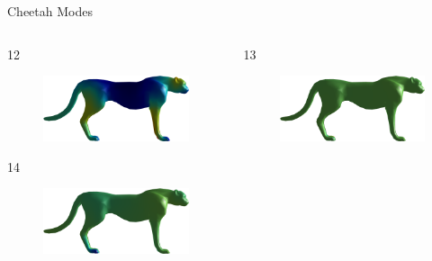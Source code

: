 \documentclass{beamer}
\begin{document}
\begin{frame}{Cheetah Modes}

\begin{columns}
\begin{column}[T]{5cm}
12
\begin{figure}[t]
    \includegraphics[width=\textwidth]{Harmonics/CheetahModes/12.png}
\end{figure}
14
\begin{figure}[t]
    \includegraphics[width=\textwidth]{Harmonics/CheetahModes/14.png}
\end{figure}
\end{column}
\begin{column}[T]{5cm}
13
\begin{figure}[t]
    \includegraphics[width=\textwidth]{Harmonics/CheetahModes/13.png}

\end{figure}
\end{column}
\end{columns}
\end{frame}
\end{document}
